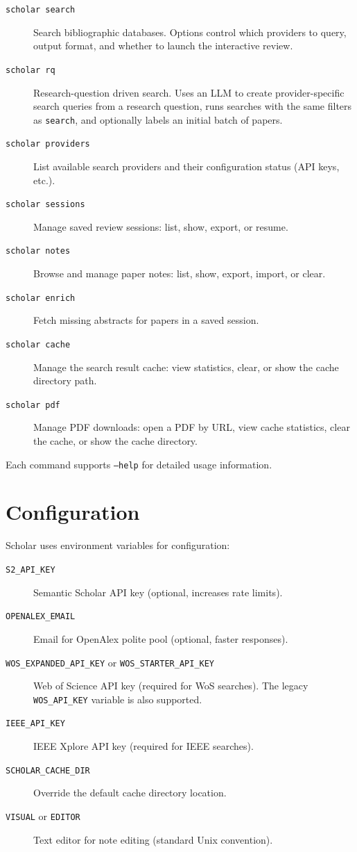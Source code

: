 \begin{description}
\item[\texttt{scholar search}] Search bibliographic databases.
  Options control which providers to query, output format, and whether to
  launch the interactive review.
\item[\texttt{scholar rq}] Research-question driven search.
  Uses an LLM to create provider-specific search queries from a research
  question, runs searches with the same filters as \texttt{search}, and
  optionally labels an initial batch of papers.
\item[\texttt{scholar providers}] List available search providers and their
  configuration status (API keys, etc.).
\item[\texttt{scholar sessions}] Manage saved review sessions: list, show, 
  export, or resume.
\item[\texttt{scholar notes}] Browse and manage paper notes: list, show, 
  export, import, or clear.
\item[\texttt{scholar enrich}] Fetch missing abstracts for papers in a saved 
  session.
\item[\texttt{scholar cache}] Manage the search result cache: view statistics, 
  clear, or show the cache directory path.
\item[\texttt{scholar pdf}] Manage PDF downloads: open a PDF by URL, view 
  cache statistics, clear the cache, or show the cache directory.
\end{description}

Each command supports \texttt{--help} for detailed usage information.


\section{Configuration}

Scholar uses environment variables for configuration:

\begin{description}
\item[\texttt{S2\_API\_KEY}] Semantic Scholar API key (optional, increases 
  rate limits).
\item[\texttt{OPENALEX\_EMAIL}] Email for OpenAlex polite pool (optional, 
  faster responses).
\item[\texttt{WOS\_EXPANDED\_API\_KEY} or \texttt{WOS\_STARTER\_API\_KEY}] Web of Science API key (required for WoS
  searches). The legacy \texttt{WOS\_API\_KEY} variable is also supported.
\item[\texttt{IEEE\_API\_KEY}] IEEE Xplore API key (required for IEEE 
  searches).
\item[\texttt{SCHOLAR\_CACHE\_DIR}] Override the default cache directory 
  location.
\item[\texttt{VISUAL} or \texttt{EDITOR}] Text editor for note editing 
  (standard Unix convention).
\end{description}


